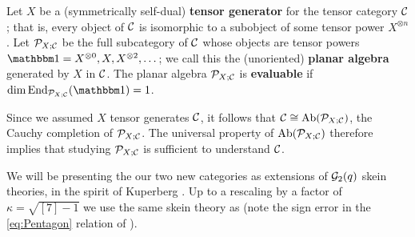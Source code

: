 Let $X$ be a (symmetrically self-dual) {\bf tensor generator} for the tensor category $\mathcal{C}$; 
that is, every object of $\mathcal{C}$ is isomorphic to a subobject of some tensor power $X^{\otimes n}$. 
Let $\mathcal{P}_{X;\mathcal{C}}$ be the full subcategory of $\mathcal{C}$ whose objects are tensor powers $\unit=X^{\otimes0},X,X^{\otimes2},\dots$; 
we call this the (unoriented) {\bf planar algebra} generated by $X$ in $\mathcal{C}$. 
The planar algebra $\mathcal{P}_{X;\mathcal{C}}$ is {\bf evaluable} if $\dim\End_{\PP_{X;\CC}}(\unit)=1$.

Since we assumed $X$ tensor generates $\mathcal{C}$, it follows that $\mathcal{C} \cong \operatorname{Ab}(\mathcal{P}_{X;\mathcal{C}})$, 
the Cauchy completion of $\mathcal{P}_{X;\mathcal{C}}$. 
The universal property of $\operatorname{Ab}(\mathcal{P}_{X;\mathcal{C}})$ therefore implies 
that studying $\mathcal{P}_{X;\mathcal{C}}$ is sufficient to understand $\mathcal{C}$.  

We will be presenting the our two new categories as extensions of $\mathcal{G}_2(q)$ skein theories, 
in the spirit of Kuperberg \cite{Kuperberg,tricats}. 
Up to a rescaling by a factor of $\kappa = \sqrt{[7]-1}$ we use the same skein theory as \cite{tricats}
(note the sign error in the \ref{eq:Pentagon} relation of \cite{Kuperberg}). 
